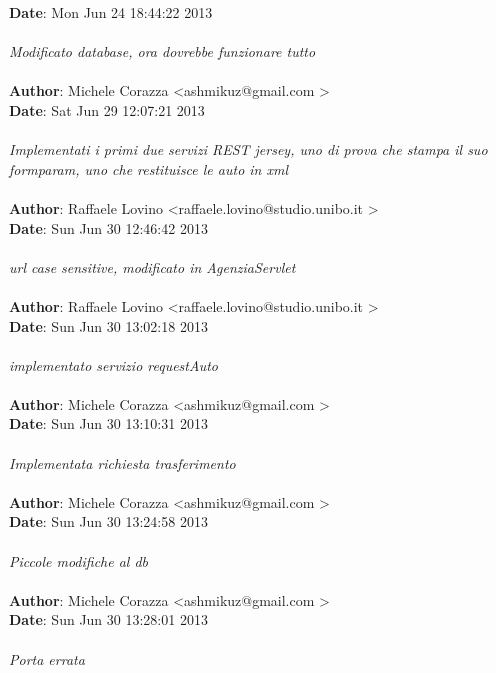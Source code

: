 \documentclass[a4paper,12pt]{article} %
\begin{document}
\textbf{Date}:   Mon Jun 24 18:44:22 2013 \\
\\
    \emph{Modificato database, ora dovrebbe funzionare tutto}\\
\\
\textbf{Author}: Michele Corazza \textless ashmikuz@gmail.com \textgreater \\
\textbf{Date}:   Sat Jun 29 12:07:21 2013 \\
\\
    \emph{Implementati i primi due servizi REST jersey, uno di prova che stampa il suo formparam, uno che restituisce le auto in xml}\\
\\
\textbf{Author}: Raffaele Lovino \textless raffaele.lovino@studio.unibo.it \textgreater \\
\textbf{Date}:   Sun Jun 30 12:46:42 2013 \\
\\
    \emph{url case sensitive, modificato in AgenziaServlet}\\
\\
\textbf{Author}: Raffaele Lovino \textless raffaele.lovino@studio.unibo.it \textgreater \\
\textbf{Date}:   Sun Jun 30 13:02:18 2013 \\
\\
    \emph{implementato servizio requestAuto}\\
\\
\textbf{Author}: Michele Corazza \textless ashmikuz@gmail.com \textgreater \\
\textbf{Date}:   Sun Jun 30 13:10:31 2013 \\
\\
    \emph{Implementata richiesta trasferimento}\\
\\
\textbf{Author}: Michele Corazza \textless ashmikuz@gmail.com \textgreater \\
\textbf{Date}:   Sun Jun 30 13:24:58 2013 \\
\\
    \emph{Piccole modifiche al db}\\
\\
\textbf{Author}: Michele Corazza \textless ashmikuz@gmail.com \textgreater \\
\textbf{Date}:   Sun Jun 30 13:28:01 2013 \\
\\
    \emph{Porta errata}\\
\\
\end{document}
